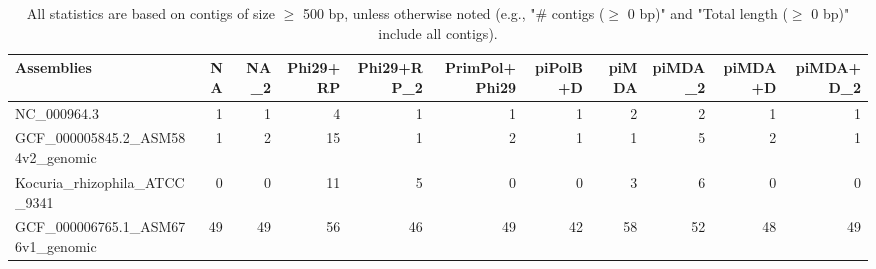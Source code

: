 \documentclass[12pt,a4paper]{article}
\begin{document}
\begin{table}[ht]
\begin{center}
\caption{All statistics are based on contigs of size $\geq$ 500 bp, unless otherwise noted (e.g., "\# contigs ($\geq$ 0 bp)" and "Total length ($\geq$ 0 bp)" include all contigs).}
\begin{tabular}{|l*{10}{|r}|}
\hline
Assemblies & NA & NA\_2 & Phi29+RP & Phi29+RP\_2 & PrimPol+Phi29 & piPolB+D & piMDA & piMDA\_2 & piMDA+D & piMDA+D\_2 \\ \hline
NC\_000964.3 & 1 & 1 & 4 & 1 & 1 & 1 & 2 & 2 & 1 & 1 \\ \hline
GCF\_000005845.2\_ASM584v2\_genomic & 1 & 2 & 15 & 1 & 2 & 1 & 1 & 5 & 2 & 1 \\ \hline
Kocuria\_rhizophila\_ATCC\_9341 & 0 & 0 & 11 & 5 & 0 & 0 & 3 & 6 & 0 & 0 \\ \hline
GCF\_000006765.1\_ASM676v1\_genomic & 49 & 49 & 56 & 46 & 49 & 42 & 58 & 52 & 48 & 49 \\ \hline
\end{tabular}
\end{center}
\end{table}
\end{document}
